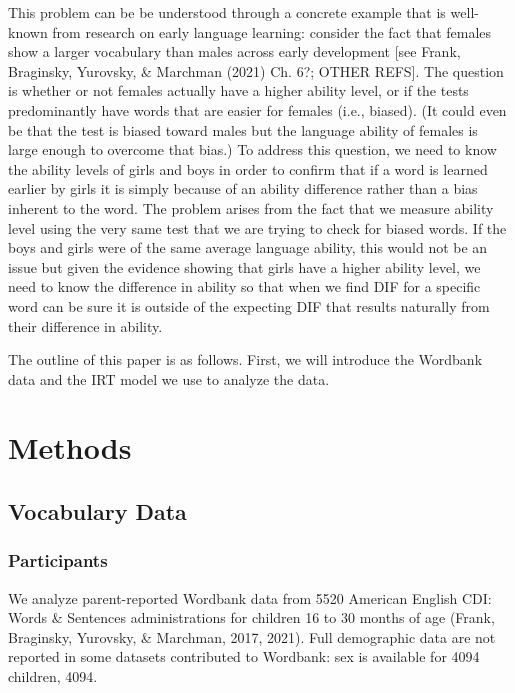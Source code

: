 \documentclass[10pt, letterpaper]{article}
\begin{document}
This problem can be be understood through a concrete example that is
well-known from research on early language learning: consider the fact
that females show a larger vocabulary than males across early
development {[}see Frank, Braginsky, Yurovsky, \& Marchman (2021) Ch.
6?; OTHER REFS{]}. The question is whether or not females actually have
a higher ability level, or if the tests predominantly have words that
are easier for females (i.e., biased). (It could even be that the test
is biased toward males but the language ability of females is large
enough to overcome that bias.) To address this question, we need to know
the ability levels of girls and boys in order to confirm that if a word
is learned earlier by girls it is simply because of an ability
difference rather than a bias inherent to the word. The problem arises
from the fact that we measure ability level using the very same test
that we are trying to check for biased words. If the boys and girls were
of the same average language ability, this would not be an issue but
given the evidence showing that girls have a higher ability level, we
need to know the difference in ability so that when we find DIF for a
specific word can be sure it is outside of the expecting DIF that
results naturally from their difference in ability.

The outline of this paper is as follows. First, we will introduce the
Wordbank data and the IRT model we use to analyze the data.

\hypertarget{methods}{%
\section{Methods}\label{methods}}

\hypertarget{vocabulary-data}{%
\subsection{Vocabulary Data}\label{vocabulary-data}}

\hypertarget{participants}{%
\subsubsection{Participants}\label{participants}}

We analyze parent-reported Wordbank data from 5520 American English CDI:
Words \& Sentences administrations for children 16 to 30 months of age
(Frank, Braginsky, Yurovsky, \& Marchman, 2017, 2021). Full demographic
data are not reported in some datasets contributed to Wordbank: sex is
available for 4094 children, 4094.
\end{document}
